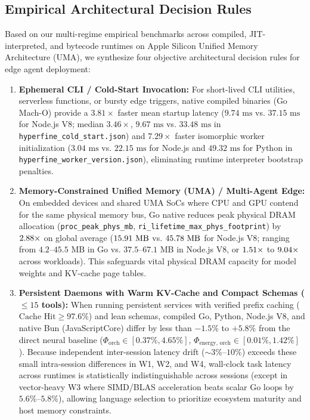 \documentclass[preprint,12pt,3p]{elsarticle}
\begin{document}
\subsection{Empirical Architectural Decision Rules}
Based on our multi-regime empirical benchmarks across compiled, JIT-interpreted, and bytecode runtimes on Apple Silicon Unified Memory Architecture (UMA), we synthesize four objective architectural decision rules for edge agent deployment:
\begin{enumerate}
    \item \textbf{Ephemeral CLI / Cold-Start Invocation:} For short-lived CLI utilities, serverless functions, or bursty edge triggers, native compiled binaries (Go Mach-O) provide a $3.81\times$ faster mean startup latency ($9.74\text{ ms}$ vs. $37.15\text{ ms}$ for Node.js V8; median $3.46\times$, $9.67\text{ ms}$ vs. $33.48\text{ ms}$ in \texttt{hyperfine\_cold\_start.json}) and $7.29\times$ faster isomorphic worker initialization ($3.04\text{ ms}$ vs. $22.15\text{ ms}$ for Node.js and $49.32\text{ ms}$ for Python in \texttt{hyperfine\_worker\_version.json}), eliminating runtime interpreter bootstrap penalties.
    \item \textbf{Memory-Constrained Unified Memory (UMA) / Multi-Agent Edge:} On embedded devices and shared UMA SoCs where CPU and GPU contend for the same physical memory bus, Go native reduces peak physical DRAM allocation (\texttt{proc\_peak\_phys\_mb}, \texttt{ri\_lifetime\_max\_phys\_footprint}) by $2.88\times$ on global average ($15.91\text{ MB}$ vs. $45.78\text{ MB}$ for Node.js V8; ranging from $4.2\text{--}45.5\text{ MB}$ in Go vs. $37.5\text{--}67.1\text{ MB}$ in Node.js V8, or $1.51\times$ to $9.04\times$ across workloads). This safeguards vital physical DRAM capacity for model weights and KV-cache page tables.
    \item \textbf{Persistent Daemons with Warm KV-Cache and Compact Schemas ($\le 15$ tools):} When running persistent services with verified prefix caching ($\text{Cache Hit} \ge 97.6\%$) and lean schemas, compiled Go, Python, Node.js V8, and native Bun (JavaScriptCore) differ by less than $-1.5\%$ to $+5.8\%$ from the direct neural baseline ($\Phi_{\text{orch}} \in [0.37\%, 4.65\%]$, $\Phi_{\text{energy, orch}} \in [0.01\%, 1.42\%]$). Because independent inter-session latency drift ($\sim 3\%\text{--}10\%$) exceeds these small intra-session differences in W1, W2, and W4, wall-clock task latency across runtimes is statistically indistinguishable across sessions (except in vector-heavy W3 where SIMD/BLAS acceleration beats scalar Go loops by $5.6\%\text{--}5.8\%$), allowing language selection to prioritize ecosystem maturity and host memory constraints.

\end{enumerate}
\end{document}
